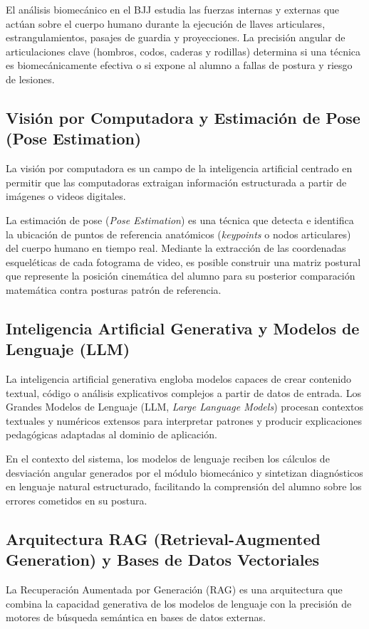 El análisis biomecánico en el BJJ estudia las fuerzas internas y externas que actúan sobre el cuerpo humano durante la ejecución de llaves articulares, estrangulamientos, pasajes de guardia y proyecciones. La precisión angular de articulaciones clave (hombros, codos, caderas y rodillas) determina si una técnica es biomecánicamente efectiva o si expone al alumno a fallas de postura y riesgo de lesiones.

\subsection{Visión por Computadora y Estimación de Pose (Pose Estimation)}
La visión por computadora es un campo de la inteligencia artificial centrado en permitir que las computadoras extraigan información estructurada a partir de imágenes o videos digitales.

La estimación de pose (\textit{Pose Estimation}) es una técnica que detecta e identifica la ubicación de puntos de referencia anatómicos (\textit{keypoints} o nodos articulares) del cuerpo humano en tiempo real. Mediante la extracción de las coordenadas esqueléticas de cada fotograma de video, es posible construir una matriz postural que represente la posición cinemática del alumno para su posterior comparación matemática contra posturas patrón de referencia.

\subsection{Inteligencia Artificial Generativa y Modelos de Lenguaje (LLM)}
La inteligencia artificial generativa engloba modelos capaces de crear contenido textual, código o análisis explicativos complejos a partir de datos de entrada. Los Grandes Modelos de Lenguaje (LLM, \textit{Large Language Models}) procesan contextos textuales y numéricos extensos para interpretar patrones y producir explicaciones pedagógicas adaptadas al dominio de aplicación.

En el contexto del sistema, los modelos de lenguaje reciben los cálculos de desviación angular generados por el módulo biomecánico y sintetizan diagnósticos en lenguaje natural estructurado, facilitando la comprensión del alumno sobre los errores cometidos en su postura.

\subsection{Arquitectura RAG (Retrieval-Augmented Generation) y Bases de Datos Vectoriales}
La Recuperación Aumentada por Generación (RAG) es una arquitectura que combina la capacidad generativa de los modelos de lenguaje con la precisión de motores de búsqueda semántica en bases de datos externas.

